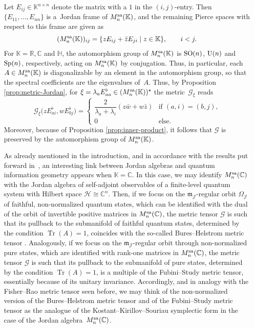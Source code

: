 \documentclass[10pt,a4paper]{amsart}
\numberwithin{equation}{section}
\newcommand{\Jcal}{\mathcal{J}}
\newcommand{\m}{\mathfrak{m}}
\newcommand{\R}{{\mathbb R}}
\newcommand{\C}{{\mathbb C}}
\newcommand{\bH}{{\mathbb H}}
\newcommand{\K}{{\mathbb K}}
\renewcommand{\m}{{\mathfrak m}}
\newcommand{\Gcal}{\mathcal{G}}
\begin{document}
Let $E_{ij} \in \K^{n\times n}$ denote the matrix with a $1$ in the $(i,j)$-entry.
Then $\{E_{11}, \dots, E_{nn}\}$ is a~Jordan frame of $M_n^{\rm sa}(\K)$, and the remaining Pierce spaces with respect to this frame are given as
\[
(M_n^{\rm sa}(\K))_{ij} = \{ z E_{ij} + \bar z E_{ji} \mid z \in \K\}, \qquad i < j.
\]
For $\K = \R, \C$ and $\bH$, the automorphism group of $M_n^{\rm sa}(\K)$ is ${\rm SO}(n)$, ${\rm U}(n)$ and ${\rm Sp}(n)$, respectively, acting on $M_n^{\rm sa}(\K)$ by conjugation. Thus, in particular, each $A \in M_n^{\rm sa}(\K)$ is diagonalizable by an element in the automorphism group, so that the spectral coefficients are the eigenvalues of~$A$. Thus, by Proposition \ref{prop:metric-Jordan}, for $\xi = \lambda_a E_{aa}^\flat \in (M_n^{\rm sa}(\K))^\star$ the metric~$\Gcal_\xi$ reads
\[
\Gcal_\xi\big(z E_{ai}^\flat, w E_{bj}^\flat\big) = \begin{cases} \dfrac2{\lambda_a + \lambda_i} (z\bar w + w \bar z) & \text{if $(a,i) = (b,j)$,}\\[1mm] 0 & \text{else.} \end{cases}
\]
{Moreover, because of Proposition \ref{prop:inner-product}, it follows that $\Gcal$ is preserved by the automorphism group of $M_n^{\rm sa}(\K)$.}

As already mentioned in the introduction, and in accordance with the results put forward in~\cite{C-J-S-2020-02,C-J-S-2020}, an interesting link between Jordan algebras and quantum information geometry appears when $\mathbb{K}=\mathbb{C}$.
In this case, we may identify $M_n^{\rm sa}(\C)$ with the Jordan algebra of self-adjoint observables of a finite-level quantum system with Hilbert space $\mathcal{H}\cong\C^{n}$.
Then, if we focus on the $\m_{\Jcal}$-regular orbit $\Omega_{\Jcal}$ of faithful, non-normalized quantum states, which can be identified with the dual of the orbit of invertible positive matrices in $M_n^{\rm sa}(\C)$, the metric tensor $\Gcal$ is such that its pullback to the submanifold of faithful quantum states, determined by the condition $\operatorname{Tr}(A)=1$, coincides with the so-called Bures--Helstrom metric tensor \cite{B-Z-2006, Dittmann-1993, Dittmann-1995, Helstrom-1967, Helstrom-1968, Helstrom-1969, Helstrom-1976, Safranek-2017, Safranek-2018, S-A-G-P-2020, Uhlmann-1992}.
Analogously, if we focus on the $\m_{\Jcal}$-regular orbit through non-normalized pure states, which are identified with rank-one matrices in $M_n^{\rm sa}(\C)$, the metric tensor $\Gcal$ is such that its pullback to the submanifold of pure states, determined by the condition $\operatorname{Tr}(A)=1$, is a multiple of the Fubini--Study metric tensor, essentially because of its unitary invariance.
Accordingly, and in analogy with the Fisher--Rao metric tensor seen before, we may think of the non-normalized version of the Bures--Helstrom metric tensor and of the Fubini--Study metric tensor as the analogue of the Kostant--Kirillov--Souriau symplectic form in the case of the Jordan algebra~$M_n^{\rm sa}(\C)$.
\end{document}
